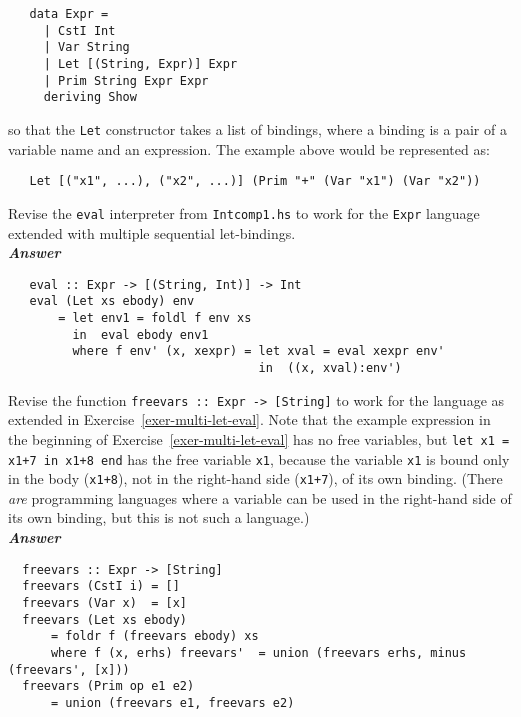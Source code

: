 \documentclass[a4paper]{article}
\begin{document}
\begin{exercise}
{\codesetup\begin{verbatim}
   data Expr = 
     | CstI Int
     | Var String
     | Let [(String, Expr)] Expr    
     | Prim String Expr Expr
     deriving Show
\end{verbatim}}

\noindent 
so that the \texttt{Let} constructor takes a list of bindings, where a
binding is a pair of a variable name and an expression.  The example
above would be represented as:

{\codesetup\begin{verbatim}
   Let [("x1", ...), ("x2", ...)] (Prim "+" (Var "x1") (Var "x2"))
\end{verbatim}}

\vspace{0.3cm}
\noindent 
Revise the \texttt{eval} interpreter from \texttt{Intcomp1.hs} to work
for the \texttt{Expr} language extended with multiple sequential
let-bindings.  \\

\noindent
\textbf{\emph{Answer}}
{\codesetup\begin{verbatim}
   eval :: Expr -> [(String, Int)] -> Int 
   eval (Let xs ebody) env
       = let env1 = foldl f env xs
         in  eval ebody env1
         where f env' (x, xexpr) = let xval = eval xexpr env'
                                   in  ((x, xval):env')
\end{verbatim}}

\end{exercise}


\begin{exercise}\label{exer-multi-let-closed}
  Revise the function \texttt{freevars ::\ Expr -> [String]} to work
  for the language as extended in Exercise~\ref{exer-multi-let-eval}.
  Note that the example expression in the beginning of
  Exercise~\ref{exer-multi-let-eval} has no free variables, but
  \texttt{let x1 = x1+7 in x1+8 end} has the free variable
  \texttt{x1}, because the variable \texttt{x1} is bound only in the
  body (\texttt{x1+8}), not in the right-hand side (\texttt{x1+7}), of
  its own binding.  (There \emph{are} programming languages where a
  variable can be used in the right-hand side of its own binding, but
  this is not such a language.)\\
  
\noindent
\textbf{\emph{Answer}}
{\codesetup\begin{verbatim}
  freevars :: Expr -> [String]
  freevars (CstI i) = []
  freevars (Var x)  = [x]
  freevars (Let xs ebody) 
      = foldr f (freevars ebody) xs 
      where f (x, erhs) freevars'  = union (freevars erhs, minus (freevars', [x]))
  freevars (Prim op e1 e2) 
      = union (freevars e1, freevars e2)
\end{verbatim}}
\end{exercise}
\end{document}
